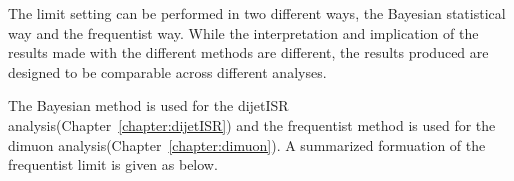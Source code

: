


The limit setting can be performed in two different ways, the Bayesian statistical way and the frequentist way. While the interpretation and implication of the results made with the different methods are different, the results produced are designed to be comparable across different analyses. 

The Bayesian method is used for the dijetISR analysis(Chapter~\ref{chapter:dijetISR}) and the frequentist method is used for the dimuon analysis(Chapter~\ref{chapter:dimuon}). A summarized formuation of the frequentist limit is given as below. 

%




